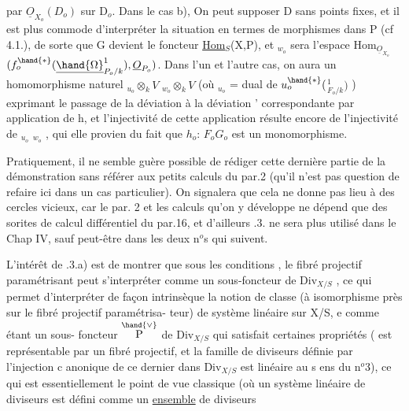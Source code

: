 
par $\underline{O}_{X_o}(D_o)$ sur D$_o$. Dans le cas b), On peut supposer D sans points
fixes, et il est plus commode d'interpréter la situation en termes de
morphismes dans P (cf 4.1.), de sorte que G devient le foncteur
\underline{Hom}$_S$(X,P), et $_{w_o}$ sera l'espace  Hom$_{\underline{O}_{X_o}}$$(f_o^{\hand{*}}(\underline{\hand{\Omega}}^{1}_{P_o/k}), \underline{O}_{P_o})$.
Dans l'un et l'autre cas, on aura un homomorphisme naturel
$_{u_o}\otimes_k V$ \hand{$\to$} $_{w_o}\otimes_k V$ (où $_{u_o}$ = dual de $u_o^{\hand{*}}($\hand{$\Omega$}$^{1}_{F_o/k})$ ) exprimant le passage
de la déviation \hand{$\delta$} à la déviation \hand{$\delta$}' correspondante par application de h,
et l'injectivité de cette application résulte encore de l'injectivité
de $_{u_o}$\hand{$\to$} $_{w_o}$ , qui elle provien du fait que $h_o$: $F_o$\hand{$\to$}$G_o$ est un
monomorphisme.
\placedmargin{$/$}

Pratiquement, il ne semble guère possible de rédiger cette dernière
partie de la démonstration sans référer aux petits calculs du par.2
(qu'il n'est pas question de refaire ici dans un cas particulier). On
signalera que cela ne donne pas lieu à des cercles vicieux, car le par.
2  et les calculs qu'on y  développe ne dépend que des sorites
de calcul différentiel du par.16, et d'ailleurs .3. ne sera plus
utilisé dans le Chap IV, sauf peut-être dans les deux n$^{o}$s qui suivent.

L'intérêt de .3.a) est de montrer que sous les conditions ,
le fibré projectif paramétrisant peut s'interpréter comme un sous-foncteur
de Div$_{X/S}$ , ce qui permet d'interpréter de façon intrinsèque la notion
de classe (à isomorphisme près sur le  fibré projectif paramétrisa-%
teur) de système linéaire sur X/S, e comme étant un sous-
foncteur $\overset{\hand{\vee}}{\text{P}}$ de Div$_{X/S}$ qui satisfait certaines propriétés ( est
représentable par un fibré projectif, et la famille de diviseurs définie
par l'injection c anonique de ce dernier dans Div$_{X/S}$ est linéaire au s ens
du n$^{o}$3), ce qui est essentiellement le point de vue classique (où un
système linéaire de diviseurs est défini comme un \uline{ensemble} de diviseurs

